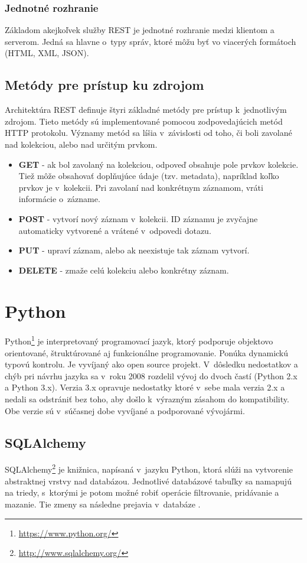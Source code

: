 \documentclass[zadani,slovak]{fitthesis}
\begin{document}
\subsubsection{Jednotné rozhranie}
Základom akejkoľvek služby REST je jednotné rozhranie medzi klientom a serverom. Jedná sa hlavne o~typy správ, ktoré môžu byť vo viacerých formátoch (HTML, XML, JSON).

\subsection{Metódy pre prístup ku zdrojom}\label{httpMetody}
Architektúra REST definuje štyri základné metódy pre prístup k~jednotlivým zdrojom. Tieto metódy sú implementované pomocou zodpovedajúcich metód HTTP protokolu. Významy metód sa líšia v~závislosti od toho, či boli zavolané nad kolekciou, alebo nad určitým prvkom.
\begin{itemize}
    \item \textbf{GET} - ak bol zavolaný na kolekciou, odpoveď obsahuje pole prvkov kolekcie. Tiež môže obsahovať doplňujúce údaje (tzv. metadata), napríklad koľko prvkov je v~kolekcii.
    Pri zavolaní nad konkrétnym záznamom, vráti informácie o~zázname.
    \item \textbf{POST} - vytvorí nový záznam v~kolekcii. ID záznamu je zvyčajne automaticky vytvorené a vrátené v~odpovedi dotazu.
    \item \textbf{PUT} - upraví záznam, alebo ak neexistuje tak záznam vytvorí.
    \item \textbf{DELETE} - zmaže celú kolekciu alebo konkrétny záznam.
\end{itemize}

\section{Python}\label{python}
Python\footnote{\url{https://www.python.org/}} je interpretovaný programovací jazyk, ktorý podporuje objektovo orientované, štruktúrované aj funkcionálne programovanie. Ponúka dynamickú typovú kontrolu. Je vyvíjaný ako open source projekt. V~dôsledku nedostatkov a chýb pri návrhu jazyka sa v~roku 2008 rozdelil vývoj do dvoch častí (Python 2.x a Python 3.x). Verzia 3.x opravuje nedostatky ktoré v~sebe mala verzia 2.x a nedali sa odstrániť bez toho, aby došlo k~výrazným zásahom do kompatibility. Obe verzie sú v~súčasnej dobe vyvíjané a podporované vývojármi.

\subsection{SQLAlchemy}\label{SQLAlchemy}
SQLAlchemy\footnote{\url{http://www.sqlalchemy.org/}} je knižnica, napísaná v~jazyku Python, ktorá slúži na vytvorenie abstraktnej vrstvy nad databázou. Jednotlivé databázové tabuľky sa namapujú na triedy, s~ktorými je potom možné robiť operácie filtrovanie, pridávanie a mazanie. Tie zmeny sa následne prejavia v~databáze \cite{copeland2008essential}.
\end{document}
